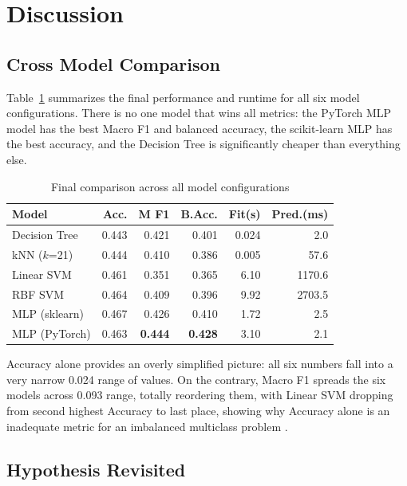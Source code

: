 \documentclass[conference]{IEEEtran}
\begin{document}
\section{Discussion}

\subsection{Cross Model Comparison}

Table~\ref{tab:final-comparison} summarizes the final performance and runtime for all six model configurations. There is no one model that wins all metrics: the PyTorch MLP model has the best Macro F1 and balanced accuracy, the scikit-learn MLP has the best accuracy, and the Decision Tree is significantly cheaper than everything else.

\begin{table}[htbp]
\caption{Final comparison across all model configurations}
\label{tab:final-comparison}
\centering
\small
\begin{tabular}{lrrrrr}
\toprule
\textbf{Model} & \textbf{Acc.} & \textbf{M F1} & \textbf{B.Acc.} & \textbf{Fit(s)} & \textbf{Pred.(ms)} \\
\midrule
Decision Tree     & 0.443 & 0.421 & 0.401 & 0.024 &    2.0 \\
kNN ($k$=21)      & 0.444 & 0.410 & 0.386 & 0.005 &   57.6 \\
Linear SVM        & 0.461 & 0.351 & 0.365 & 6.10  & 1170.6 \\
RBF SVM           & 0.464 & 0.409 & 0.396 & 9.92  & 2703.5 \\
MLP (sklearn)     & 0.467 & 0.426 & 0.410 & 1.72  &    2.5 \\
MLP (PyTorch)     & 0.463 & \textbf{0.444} & \textbf{0.428} & 3.10  &    2.1 \\
\bottomrule
\end{tabular}
\end{table}

Accuracy alone provides an overly simplified picture: all six numbers fall into a very narrow 0.024 range of values. On the contrary, Macro F1 spreads the six models across 0.093 range, totally reordering them, with Linear SVM dropping from second highest Accuracy to last place, showing why Accuracy alone is an inadequate metric for an imbalanced multiclass problem \cite{he2009}.

\subsection{Hypothesis Revisited}
\end{document}

